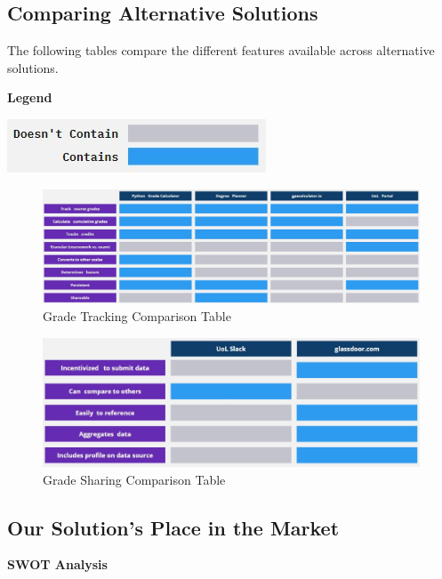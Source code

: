 \documentclass{article}
\begin{document}
\subsection{Comparing Alternative Solutions}
The following tables compare the different features available across alternative solutions.
\medskip

\noindent \textbf{Legend}

\noindent \includegraphics{comparison-legend}
\medskip

\begin{figure}[h]
\noindent \includegraphics[width=\textwidth]{comparison-table-tracking}
\caption{Grade Tracking Comparison Table}
\label{fig: comparison-table1}
\end{figure}
\medskip

\begin{figure}[h]
\noindent \includegraphics[width=\textwidth]{comparison-table-sharing}
\caption{Grade Sharing Comparison Table}
\label{fig: comparison-table2}
\end{figure}

\subsection{Our Solution's Place in the Market}
\textbf{SWOT Analysis}
\end{document}
